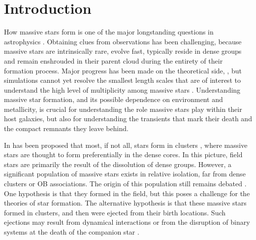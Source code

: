 \documentclass[a4paper,fleqn,usenatbib]{mnras}
\newcommand{\todo}[1]{{\large $\blacksquare$~\textbf{\color{red}[#1]}}~$\blacksquare$}
\begin{document}
\section{Introduction}
\label{sec:intro}

How massive stars form is one of the major longstanding questions in astrophysics
\citep[e.g.,][]{zinnecker:07}. Obtaining clues from observations has been challenging, because massive stars are intrinsically rare, 
evolve fast, typically reside in dense groups and remain enshrouded in
their parent cloud during the entirety of their formation
process. Major progress has been made on the theoretical side,
\citep[e.g.][]{kuiper:15,rosen:16}, but simulations cannot yet resolve
the smallest length scales that are of interest to understand the 
high level of multiplicity among massive stars  \citep[e.g.,][]{bate:09, sana:17}. Understanding massive star formation, and its
possible dependence on environment and metallicity, is crucial for
understanding the role massive stars play within their host galaxies,
but also for understanding the transients that
mark their death and the compact remnants they leave behind. %

In has been proposed that most, if not all, stars form in clusters
\citep{lada:03}, where massive stars are thought to  form
preferentially in the dense cores. In this picture, field stars are primarily the result of the dissolution of dense groups. 
However, a significant population of massive stars exists in relative
isolation,  far from dense clusters or OB associations. The origin of
this population still remains debated \citep{gvaramadze:12, lamb:16,ward:18}.  One
hypothesis is that they  formed in the field, but this poses a
challenge for the theories of star formation. The alternative
hypothesis is that these massive stars formed in clusters, and then
were ejected from their birth locations. Such ejections may result
from dynamical interactions \citep[e.g.,][]{poveda:67} or from the
disruption of binary systems at the death of the companion %
star \citep[e.g.,][]{zwicky:57, blaauw:61, renzo:18}. 
\end{document}

